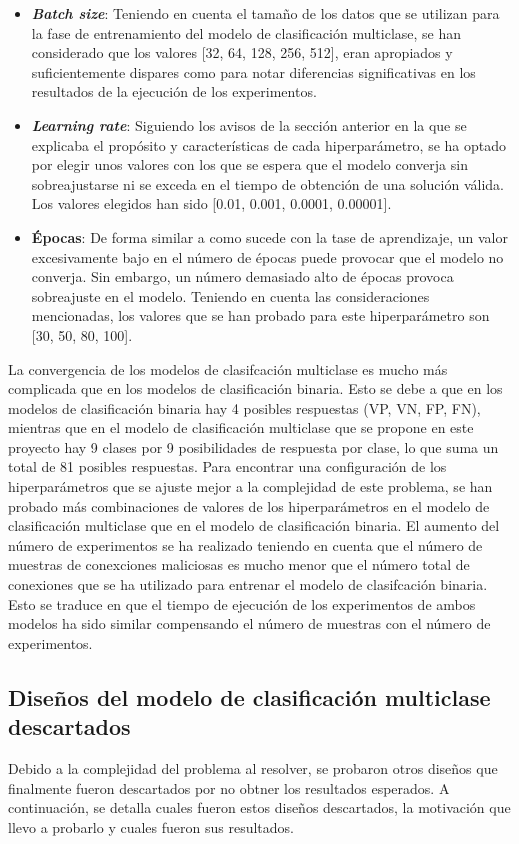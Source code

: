 \begin{itemize}
	\item \textbf{\textit{Batch size}}: Teniendo en cuenta el tamaño de los datos que se utilizan para la fase de entrenamiento del modelo de clasificación multiclase, se han considerado que los valores [32, 64, 128, 256, 512], eran apropiados y suficientemente dispares como para notar diferencias significativas en los resultados de la ejecución de los experimentos.
	\item \textbf{\textit{Learning rate}}: Siguiendo los avisos de la sección anterior en la que se explicaba el propósito y características de cada hiperparámetro, se ha optado por elegir unos valores con los que se espera que el modelo converja sin sobreajustarse ni se exceda en el tiempo de obtención de una solución válida. Los valores elegidos han sido [0.01, 0.001, 0.0001, 0.00001].
	\item \textbf{Épocas}: De forma similar a como sucede con la tase de aprendizaje, un valor excesivamente bajo en el número de épocas puede provocar que el modelo no converja. Sin embargo, un número demasiado alto de épocas provoca sobreajuste en el modelo. Teniendo en cuenta las consideraciones mencionadas, los valores que se han probado para este hiperparámetro son [30, 50, 80, 100].
\end{itemize}

La convergencia de los modelos de clasifcación multiclase es mucho más complicada que en los modelos de clasificación binaria. Esto se debe a que en los modelos de clasificación binaria hay 4 posibles respuestas (VP, VN, FP, FN), mientras que en el  modelo de clasificación multiclase que se propone en este proyecto hay 9 clases por 9 posibilidades de respuesta por clase, lo que suma un total de 81 posibles respuestas. Para encontrar una configuración de los hiperparámetros que se ajuste mejor a la complejidad de este problema, se han probado más combinaciones de valores de los hiperparámetros en el modelo de clasificación multiclase que en el modelo de clasificación binaria. El aumento del número de experimentos se ha realizado teniendo en cuenta que el número de muestras de conexciones maliciosas es mucho menor que el número total de conexiones que se ha utilizado para entrenar el modelo de clasifcación binaria. Esto se traduce en que el tiempo de ejecución de los experimentos de ambos modelos ha sido similar compensando el número de muestras con el número de experimentos.

\subsection{Diseños del modelo de clasificación multiclase descartados}
Debido a la complejidad del problema al resolver, se probaron otros diseños que finalmente fueron descartados por no obtner los resultados esperados. A continuación, se detalla cuales fueron estos diseños descartados, la motivación que llevo a probarlo y cuales fueron sus resultados.

